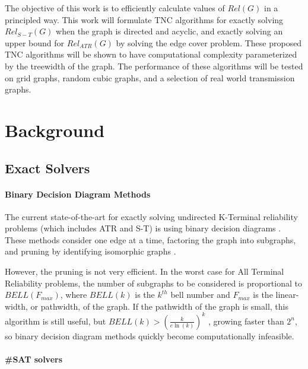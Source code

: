 \documentclass[12pt,twocolumn]{article}
\begin{document}
The objective of this work is to efficiently calculate values of \(Rel(G)\) in a principled way. This work will formulate TNC algorithms for exactly solving \(Rel_{S-T}(G)\) when the graph is directed and acyclic, and exactly solving an upper bound for \(Rel_{ATR}(G)\) by solving the edge cover problem. These proposed TNC algorithms will be shown to have computational complexity parameterized by the treewidth of the graph. The performance of these algorithms will be tested on grid graphs, random cubic graphs, and a selection of real world transmission graphs.

\hypertarget{background}{%
\section{Background}\label{background}}

\hypertarget{exact-solvers}{%
\subsection{Exact Solvers}\label{exact-solvers}}

\hypertarget{binary-decision-diagram-methods}{%
\paragraph{\texorpdfstring{Binary Decision Diagram Methods\\
}{Binary Decision Diagram Methods }}\label{binary-decision-diagram-methods}}

The current state-of-the-art for exactly solving undirected K-Terminal reliability problems (which includes ATR and S-T) is using binary decision diagrams \cite{carlier1996decomposition}. These methods consider one edge at a time, factoring the graph into subgraphs, and pruning by identifying isomorphic graphs \cite{hardy2007k}.

However, the pruning is not very efficient. In the worst case for All Terminal Reliability problems, the number of subgraphs to be considered is proportional to \(BELL(F_{max})\), where \(BELL(k)\) is the \(k^{th}\) bell number and \(F_{max}\) is the linear-width, or pathwidth, of the graph. If the pathwidth of the graph is small, this algorithm is still useful, but \(BELL(k)>(\frac{k}{e\ln(k)})^k\) \cite{berend2010improved}, growing faster than \(2^n\), so binary decision diagram methods quickly become computationally infeasible.

\hypertarget{sat-solvers}{%
\paragraph{\texorpdfstring{\#SAT solvers\\
}{\#SAT solvers }}\label{sat-solvers}}
\end{document}
